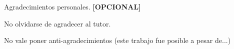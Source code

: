 \documentclass[
11pt, %
spanish,
singlespacing, %
parskip, %
headsepline, %
]{MastersDoctoralThesis} %
\renewcommand{\listtablename}{Índice de Tablas}
\renewcommand{\tablename}{Tabla}
\begin{document}

\begin{acknowledgements}
\vspace{1.5cm}

Agradecimientos personales. \textbf{[OPCIONAL]} 

No olvidarse de agradecer al tutor.

No vale poner anti-agradecimientos (este trabajo fue posible a pesar de...)

\end{acknowledgements}

\renewcommand{\listtablename}{Índice de Tablas}

\tableofcontents %

\listoffigures %

\listoftables %





\mainmatter %

\pagestyle{thesis} %

\renewcommand{\tablename}{Tabla} 


\newcommand{\keyword}[1]{\textbf{#1}}
\newcommand{\tabhead}[1]{\textbf{#1}}
\newcommand{\code}[1]{\texttt{#1}}
\newcommand{\file}[1]{\texttt{\bfseries#1}}
\newcommand{\option}[1]{\texttt{\itshape#1}}
\newcommand{\grados}{$^{\circ}$}
\end{document}
